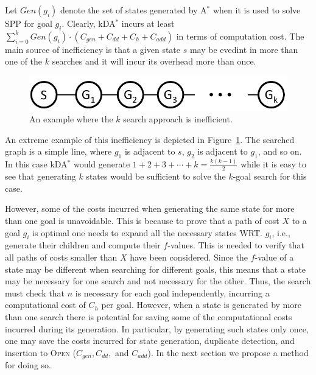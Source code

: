 \documentclass{aicom2e}
\newcommand{\kgs}{$k$-goal search}
\newcommand{\astar}{A$^*$}
\newcommand{\kxastar}{kDA$^*$}
\newcommand{\open}{\textsc{Open}}
\begin{document}

Let $Gen(g_i)$ denote the set of states generated by \astar{} when it is used
to solve SPP for goal $g_i$. Clearly, \kxastar{} incurs at least $\sum_{i=0}^k
Gen(g_i)\cdot(C_{gen}+C_{dd}+C_{h}+C_{add})$ in terms of computation cost. The
main source of inefficiency is that a given state $s$ may be evedint in more
than one of the $k$ searches and it will incur its overhead more than once.


\begin{figure}
    \includegraphics[width=\columnwidth]{k-search-bad_cropped}
    \caption{An example where the $k$ search approach is inefficient.}
    \label{fig:k-search-bad}
\end{figure}
An extreme example of this inefficiency is depicted in
Figure~\ref{fig:k-search-bad}. The searched graph is a simple line, where $g_1$
is adjacent to $s$, $g_2$ is adjacent to $g_1$, and so on. In this case
\kxastar{} would generate $1+2+3+\cdots+k=\frac{k(k-1)}{2}$ while it is easy to
see that generating $k$ states would be sufficient to solve the \kgs{} for this
case.



However, some of the costs incurred when generating the same state for more
than one goal is unavoidable. This is because to prove that a path of cost $X$
to a goal $g_i$ is optimal one needs to expand all the necessary states WRT.
$g_i$, i.e., generate their children and compute their $f$-values. This is
needed to verify that all paths of costs smaller than $X$ have been considered.
Since the $f$-value of a state may be different when searching for different
goals, this means that a state may be necessary for one search and not
necessary for the other. Thus, the search must check that $n$ is necessary for
each goal independently, incurring a computational cost of $C_{h}$ per goal.
However, when a state is generated by more than one search there is potential
for saving some of the computational costs incurred during its generation. In
particular, by generating such states only once, one may save the costs
incurred for state generation, duplicate detection, and insertion to \open{}
($C_{gen}, C_{dd},$ and $C_{add}$). In the next section we propose a method for
doing so.
\end{document}
